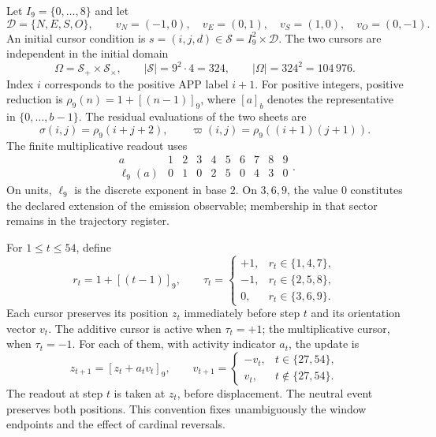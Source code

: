 Let $I_9=\{0,\ldots,8\}$ and let
\[
 \mathcal D=\{N,E,S,O\},\qquad
 v_N=(-1,0),\quad v_E=(0,1),\quad
 v_S=(1,0),\quad v_O=(0,-1).
\]
An initial cursor condition is $s=(i,j,d)\in
\mathcal S=I_9^2\times\mathcal D$. The two cursors are independent
in the initial domain
\begin{equation}
 \Omega=\mathcal S_+\times\mathcal S_\times,
 \qquad |\mathcal S|=9^2\cdot4=324,
 \qquad |\Omega|=324^2=104\,976.
 \label{iii:iii:nf-dominio}
\end{equation}
Index $i$ corresponds to the positive APP label $i+1$. For
positive integers, positive reduction is $\rho_9(n)=1+[(n-1)]_9$,
where $[a]_b$ denotes the representative in $\{0,\ldots,b-1\}$.
The residual evaluations of the two sheets are
\[
 \sigma(i,j)=\rho_9(i+j+2),\qquad
 \varpi(i,j)=\rho_9((i+1)(j+1)).
\]
The finite multiplicative readout uses
\begin{equation}
 \begin{array}{c|rrrrrrrrr}
 a&1&2&3&4&5&6&7&8&9\\ \hline
 \ell_9(a)&0&1&0&2&5&0&4&3&0
 \end{array}.
 \label{iii:iii:nf-log}
\end{equation}
On units, $\ell_9$ is the discrete exponent in base $2$.
On $3,6,9$, the value $0$ constitutes the declared extension of the
emission observable; membership in that sector remains in the
trajectory register.

For $1\le t\le54$, define
\[
 r_t=1+[(t-1)]_9,
 \qquad
 \tau_t=
 \begin{cases}
 +1,&r_t\in\{1,4,7\},\\
 -1,&r_t\in\{2,5,8\},\\
 0,&r_t\in\{3,6,9\}.
 \end{cases}
\]
Each cursor preserves its position $z_t$ immediately before step
$t$ and its orientation vector $v_t$. The additive cursor is active
when $\tau_t=+1$; the multiplicative cursor, when $\tau_t=-1$. For each
of them, with activity indicator $a_t$, the update is
\begin{equation}
 z_{t+1}=[z_t+a_tv_t]_9,
 \qquad
 v_{t+1}=
 \begin{cases}
 -v_t,&t\in\{27,54\},\\
 v_t,&t\notin\{27,54\}.
 \end{cases}
 \label{iii:iii:nf-actualizacion}
\end{equation}
The readout at step $t$ is taken at $z_t$, before displacement.
The neutral event preserves both positions. This convention fixes
unambiguously the window endpoints and the effect of
cardinal reversals.

